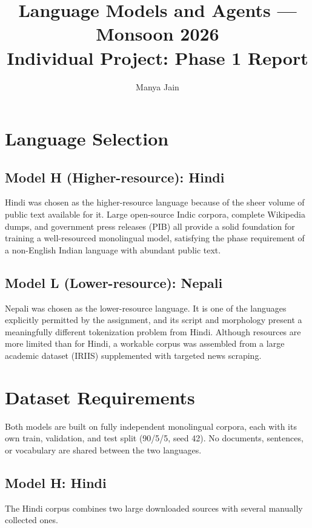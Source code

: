 \documentclass[11pt]{article}
\title{\vspace{-1.5cm}\textbf{Language Models and Agents --- Monsoon 2026}\\[4pt]
\large Individual Project: Phase 1 Report}
\author{Manya Jain}
\date{}
\begin{document}
\maketitle
\vspace{-1cm}

\section{Language Selection}

\subsection{Model H (Higher-resource): Hindi}
Hindi was chosen as the higher-resource language because of the sheer volume of public text available for it. Large open-source Indic corpora, complete Wikipedia dumps, and government press releases (PIB) all provide a solid foundation for training a well-resourced monolingual model, satisfying the phase requirement of a non-English Indian language with abundant public text.

\subsection{Model L (Lower-resource): Nepali}
Nepali was chosen as the lower-resource language. It is one of the languages explicitly permitted by the assignment, and its script and morphology present a meaningfully different tokenization problem from Hindi. Although resources are more limited than for Hindi, a workable corpus was assembled from a large academic dataset (IRIIS) supplemented with targeted news scraping.

\section{Dataset Requirements}

Both models are built on fully independent monolingual corpora, each with its own train, validation, and test split (90/5/5, seed 42). No documents, sentences, or vocabulary are shared between the two languages.

\subsection{Model H: Hindi}
The Hindi corpus combines two large downloaded sources with several manually collected ones.
\end{document}
